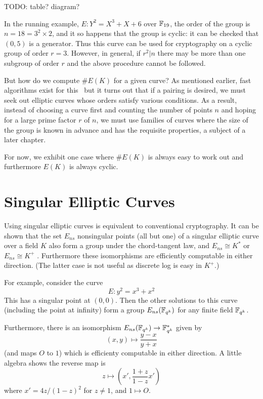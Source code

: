 TODO: table? diagram?

In the running example, $E : Y^2 = X^3 + X + 6$ over $\mathbb{F}_{19}$,
the order of the group is $n = 18 = 3^2 \times 2$, and it so happens
that the group is cyclic: it can be checked that $(0,5)$ is a generator.
Thus this curve can be used
for cryptography on a cyclic group of order $r = 3$. However, in general,
if $r^2 | n$ there may be more than one subgroup of order $r$ and the
above procedure cannot be followed.

But how do we compute $\#E(K)$ for a given curve?
As mentioned earlier, fast algorithms exist for this~\cite{bss}
but it turns out that if a pairing is desired, we must seek out
elliptic curves whose orders satisfy various conditions.
As a result,
instead of choosing a curve first and counting the number of points $n$ and
hoping for a large prime factor $r$ of $n$,
we must use families of curves where the size of the group
is known in advance and has the requisite properties,
a subject of a later chapter.

For now, we exhibit one case where $\#E(K)$ is always easy to work out
and furthermore $E(K)$ is always cyclic.

\section {Singular Elliptic Curves}

Using singular elliptic curves
is equivalent to conventional cryptography.
It can be shown that the set $E_{ns}$ nonsingular points (all but
one) of a singular elliptic curve over a field $K$
also form a group under the chord-tangent law,
and $E_{ns} \cong K^*$ or $E_{ns} \cong K^+$ \cite{prop2.5silverman}.
Furthermore these isomorphisms are efficiently computable in either
direction.
(The latter case is not useful as discrete log is easy in $K^+$.)

For example, consider the curve
\[ E : y^2 = x^3 + x^2 \]
This has a singular point at $(0,0)$. Then the other solutions to
this curve (including the point at infinity) form a group
$E_{ns}(\mathbb{F}_{q^k})$ for any finite field $\mathbb{F}_{q^k}$.

Furthermore, there is an isomorphism $E_{ns}(\mathbb{F}_{q^k}) \rightarrow \mathbb{F}_{q^k}^*$
given by
\[ (x,y) \mapsto \frac{y-x}{y+x} \]
(and maps $O$ to $1$)
which is efficienty computable in either direction.
A little algebra
shows the reverse map is
\[ z \mapsto \left( x', \frac{1+z}{1-z} x' \right) \]
where $x' = 4z/(1-z)^2$ for $z \ne 1$, and $1 \mapsto O$.

